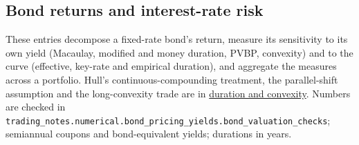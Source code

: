\subsection{Bond returns and interest-rate risk}

These entries decompose a fixed-rate bond's return, measure its sensitivity to its own yield (Macaulay, modified and money duration, PVBP, convexity) and to the curve (effective, key-rate and empirical duration), and aggregate the measures across a portfolio. Hull's continuous-compounding treatment, the parallel-shift assumption and the long-convexity trade are in \hyperref[mod:duration-convexity]{duration and convexity}. Numbers are checked in \nolinkurl{trading_notes.numerical.bond_pricing_yields.bond_valuation_checks}; semiannual coupons and bond-equivalent yields; durations in years.

